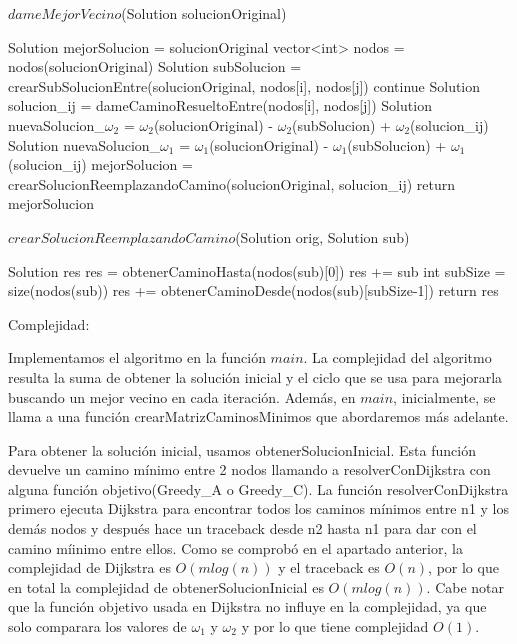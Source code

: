 \begin{algorithm}[H]
\caption{$dameMejorVecino$(Solution solucionOriginal)}
\begin{algorithmic}[1]	
	  \State Solution mejorSolucion = solucionOriginal
	  \State vector<int> nodos = nodos(solucionOriginal)
			\State Solution subSolucion = crearSubSolucionEntre(solucionOriginal, nodos[i], nodos[j])
				\State continue
			\EndIf
			\State Solution solucion\_ij = dameCaminoResueltoEntre(nodos[i], nodos[j])
			\State Solution nuevaSolucion\_$\omega_2$ = $\omega_2$(solucionOriginal) - $\omega_2$(subSolucion) + $\omega_2$(solucion\_ij)
			\State Solution nuevaSolucion\_$\omega_1$ = $\omega_1$(solucionOriginal) - $\omega_1$(subSolucion) + $\omega_1$(solucion\_ij)			
				\State mejorSolucion = crearSolucionReemplazandoCamino(solucionOriginal, solucion\_ij)
			\EndIf
		\EndFor
	\EndFor
	\State return mejorSolucion
\end{algorithmic}
\end{algorithm}

\begin{algorithm}[H]
\caption{$crearSolucionReemplazandoCamino$(Solution orig, Solution sub)}
\begin{algorithmic}[1]	
	 \State Solution res
	 \State res = obtenerCaminoHasta(nodos(sub)[0])
	 \State res += sub
	 \State int subSize = size(nodos(sub))
	 \State res += obtenerCaminoDesde(nodos(sub)[subSize-1])	  
	\State return res
\end{algorithmic}
\end{algorithm}

Complejidad:

Implementamos el algoritmo en la función $main$. La complejidad del algoritmo resulta la suma de obtener la solución inicial y el ciclo que se usa para mejorarla buscando un mejor vecino en cada iteración. 
Además, en $main$, inicialmente, se llama a una función crearMatrizCaminosMinimos que abordaremos más adelante.

Para obtener la solución inicial, usamos obtenerSolucionInicial. Esta función devuelve un camino mínimo entre 2 nodos llamando a resolverConDijkstra con alguna función objetivo(Greedy\_A o Greedy\_C). La función resolverConDijkstra primero ejecuta Dijkstra para encontrar todos los caminos mínimos entre n1 y los demás nodos y después hace un traceback desde n2 hasta n1 para dar con el camino míinimo entre ellos. Como se comprobó en el apartado anterior, la complejidad de Dijkstra es $O(m log(n))$ y el traceback es $O(n)$, por lo que en total la complejidad de obtenerSolucionInicial es $O(m log(n))$. Cabe notar que la función objetivo usada en Dijkstra no influye en la complejidad, ya que solo comparara los valores de $\omega_1$ y $\omega_2$ y por lo que tiene complejidad $O(1)$.

